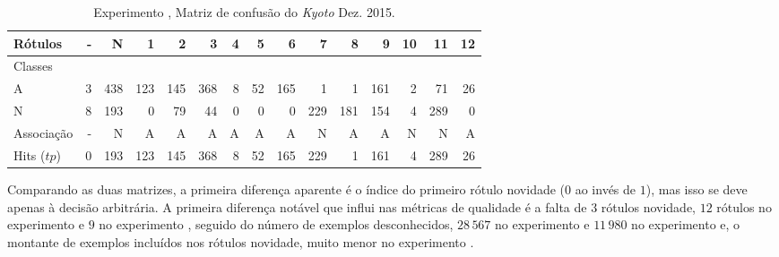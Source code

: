 \begin{table}[hbt]%
  {\footnotesize
  \begin{center}
  \caption{Experimento \expA, Matriz de confusão do \dataset \emph{Kyoto} Dez. 2015.}
  \label{tab:java-matrix}
  \begin{tabular}{l *{14}{|r} }
    Rótulos   &     - &       N &    1 &    2 &    3 &  4 &   5 &    6 &    7 &     8 &    9 &    10 &   11 &  12 \\\hline
    Classes  &       &         &      &      &      &    &     &      &      &       &      &       &      &     \\\hline
    \hline
    A        &  3 &  438 &  123 &  145 &  368 &  8 &  52 &  165 &    1 &  1 &  161 &  2 &   71 &  26 \\\hline
    N        &  8 &  193 &    0 &   79 &   44 &  0 &   0 &    0 &  229 &   181 &  154 &  4 &  289 &   0 \\\hline
    \hline
    Associação &     - &       N &    A &    A &    A &  A &   A &    A &    N &     A &    A &     N &    N &   A \\\hline
    Hits ($tp$)     &     0 &  193 &  123 &  145 &  368 &  8 &  52 &  165 &  229 &  1 &  161 &  4 &  289 &  26 
  \end{tabular}
\end{center}
}
\end{table}

Comparando as duas matrizes, a primeira diferença aparente é o índice do
primeiro rótulo novidade ($0$ ao invés de $1$), mas isso se deve apenas à decisão
arbitrária.
A primeira diferença notável que influi nas métricas de qualidade é a falta de 3
rótulos novidade, $12$ rótulos no experimento \expA e $9$ no experimento \expB,
seguido do número de exemplos desconhecidos, $28\,567$ no experimento \expB e
$11\,980$ no experimento \expA e, o montante de exemplos incluídos nos rótulos
novidade, muito menor no experimento \expB.

